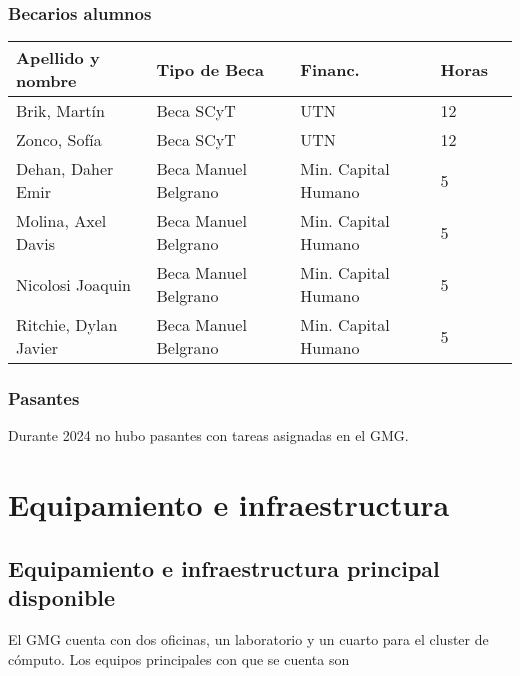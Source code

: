 \documentclass[a4paper,11pt,twoside,final,titlepage,onecolumn,openright]{report}
\begin{document}
\subsubsection{Becarios alumnos}

\begin{tabular}{l l l l r}
\toprule
Apellido y nombre & Tipo de Beca & Financ. & Horas \\
\midrule
Brik, Martín & Beca SCyT & UTN & 12 \\
Zonco, Sofía & Beca SCyT & UTN & 12 \\
Dehan, Daher Emir & Beca Manuel Belgrano & Min. Capital Humano & 5 \\
Molina, Axel Davis & Beca Manuel Belgrano & Min. Capital Humano & 5 \\
Nicolosi Joaquin & Beca Manuel Belgrano & Min. Capital Humano & 5 \\
Ritchie, Dylan Javier & Beca Manuel Belgrano & Min. Capital Humano & 5 \\
\bottomrule 
\end{tabular}

 \subsubsection{Pasantes}

 Durante 2024 no hubo pasantes con tareas asignadas en el GMG.

\normalsize


\section{Equipamiento e infraestructura}

\subsection{Equipamiento e infraestructura principal disponible}

El GMG cuenta con dos oficinas, un laboratorio y un cuarto para el cluster de cómputo. Los equipos principales con que se cuenta son
\end{document}
